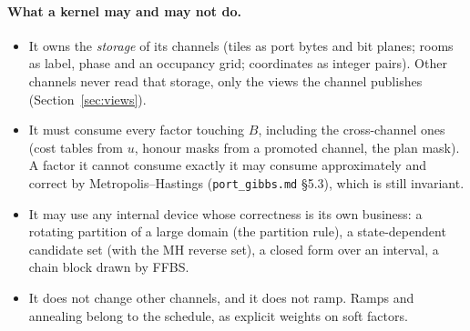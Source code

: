\documentclass[11pt]{article}
\newcommand{\1}{\mathds{1}}
\begin{document}
\paragraph{What a kernel may and may not do.}
\begin{itemize}
  \item It owns the \emph{storage} of its channels (tiles as port bytes and bit
        planes; rooms as label, phase and an occupancy grid; coordinates as
        integer pairs). Other channels never read that storage, only the views
        the channel publishes (Section~\ref{sec:views}).
  \item It must consume every factor touching $B$, including the cross-channel
        ones (cost tables from $u$, honour masks from a promoted channel, the
        plan mask). A factor it cannot consume exactly it may consume
        approximately and correct by Metropolis--Hastings (\texttt{port\_gibbs.md}
        \S5.3), which is still invariant.
  \item It may use any internal device whose correctness is its own business:
        a rotating partition of a large domain (the partition rule), a
        state-dependent candidate set (with the MH reverse set), a closed form
        over an interval, a chain block drawn by FFBS.
  \item It does not change other channels, and it does not ramp. Ramps and
        annealing belong to the schedule, as explicit weights on soft factors.
\end{itemize}
\end{document}
